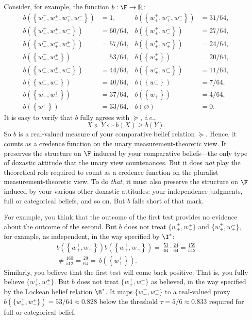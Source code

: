 Consider, for example, the function $b:\F\rightarrow\mathbb{R}$:
$$
\begin{aligned}
	b(\left\{w^+_+,w^+_-,w^-_+,w^-_-\right\})&=1,& b(\left\{w^+_+,w^-_+,w^-_-\right\})&=31/64,\\
	b(\left\{w^+_+,w^+_-,w^-_-\right\})&=60/64,& b(\left\{w^+_+,w^-_-\right\})&=27/64 ,\\
	b(\left\{w^+_+,w^-_+,w^+_-\right\})&=57/64,& b(\left\{w^+_+,w^-_+\right\})&=24/64,\\
	b(\left\{w^+_+,w^+_-\right\})&=53/64,& b(\left\{w^+_+\right\})&=20/64,\\
	b(\left\{w^-_+,w^+_-,w^-_-\right\})&=44/64,& b(\left\{w^-_+,w^-_-\right\})&=11/64,\\
	b(\left\{w^+_-,w^-_-\right\})&=40/64,& b(\left\{w^-_-\right\})&=7/64,\\ 
	b(\left\{w^-_+,w^+_-\right\})&=37/64,& b(\left\{w^-_+\right\})&=4/64,\\
	b(\left\{w^+_-\right\})&=33/64,& b(\varnothing)&=0.
\end{aligned}
$$
It is easy to verify that $b$ fully agrees with $\succeq$, \textit{i.e.},
$$ X\succeq Y  \Leftrightarrow  b(X)\geq b(Y). $$
So $b$ is a real-valued measure of your comparative belief relation $\succeq$. Hence, it counts as a credence function on the unary measurement-theoretic view. It preserves the structure on $\F$ induced by your comparative beliefs---the only type of doxastic attitude that the unary view countenances. But it does \emph{not} play the theoretical role required to count as a credence function on the pluralist measurement-theoretic view. To do \emph{that}, it must also preserve the structure on $\F$ induced by your various other doxastic attitudes: your independence judgments, full or categorical beliefs, and so on. But $b$ falls short of that mark.

For example, you think that the outcome of the first test provides no evidence about the outcome of the second. But $b$ does not treat $\{w^+_+,w^+_-\}$ and $\{w^+_+,w^-_+\}$, for example, as independent, in the way specified by $\I^*$:
\begin{multline*}
b\left(\left\{w^+_+,w^+_-\right\}\right) b\left(\left\{w^+_+,w^-_+\right\}\right) = \
\frac{53}{64}\cdot\frac{24}{64} = \frac{159}{512} \\
\not = \frac{160}{512} = \frac{20}{64} = \
b\left(\left\{w^+_+\right\}\right).
\end{multline*}
Similarly, you believe that the first test will come back positive. That is, you fully believe $\{w^+_+,w^+_-\}$. But $b$ does not treat $\{w^+_+,w^+_-\}$ as believed, in the way specified by the Lockean belief relation $\B^*$. It maps $\{w^+_+,w^+_-\}$ to a real-valued proxy $b(\{w^+_+,w^+_-\})=53/64\approx 0.828$ below the threshold $\tau=5/6\approx0.833$ required for full or categorical belief.


